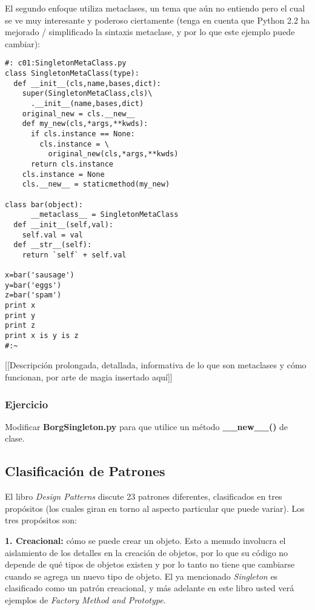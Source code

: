 El segundo enfoque utiliza metaclases, un tema que aún no entiendo pero el cual se ve muy interesante y poderoso ciertamente (tenga en cuenta que Python 2.2 ha mejorado / simplificado la sintaxis metaclase, y por lo que este ejemplo puede cambiar): \newline


\begin{lstlisting}
#: c01:SingletonMetaClass.py 
class SingletonMetaClass(type): 
  def __init__(cls,name,bases,dict): 
    super(SingletonMetaClass,cls)\ 
      .__init__(name,bases,dict) 
    original_new = cls.__new__ 
    def my_new(cls,*args,**kwds): 
      if cls.instance == None: 
        cls.instance = \ 
          original_new(cls,*args,**kwds) 
      return cls.instance 
    cls.instance = None 
    cls.__new__ = staticmethod(my_new) 
    
class bar(object): 
      __metaclass__ = SingletonMetaClass 
  def __init__(self,val): 
    self.val = val 
  def __str__(self): 
    return `self` + self.val 
    
x=bar('sausage') 
y=bar('eggs') 
z=bar('spam') 
print x 
print y 
print z 
print x is y is z 
#:~ 
\end{lstlisting}
  
[[Descripción prolongada, detallada, informativa de lo que son metaclases y cómo funcionan, por arte de magia insertado aquí]]    

\subsubsection*{Ejercicio}
Modificar \textbf{BorgSingleton.py} para que utilice un método \textbf{\_\_new\_\_()} de clase.

\subsection*{Clasificación de Patrones}
\label{subsec:clPat}

El libro \textit{Design Patterns} discute 23 patrones diferentes, clasificados en tres propósitos (los cuales giran en torno al aspecto particular que puede variar). Los tres propósitos son:  \newline

\textbf{1. Creacional:} 
cómo se puede crear un objeto. Esto a menudo involucra el aislamiento de los detalles en la creación de objetos, por lo que su código no depende de qué tipos de objetos existen y por lo tanto no tiene que cambiarse cuando se agrega un nuevo tipo de objeto. El ya mencionado \textit{Singleton} es clasificado como un patrón creacional, y más adelante en este libro usted verá ejemplos de \textit{Factory Method and Prototype}.     \newline

